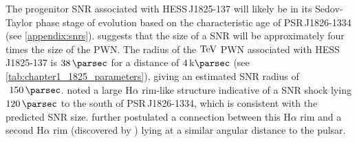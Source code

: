 The progenitor SNR associated with \mbox{HESS\,J1825-137} will likely be in its Sedov-Taylor phase stage of evolution based on the characteristic age of \mbox{PSR\,J1826-1334} (see \autoref{appendix:snrs}). \cite{2001A&A...380..309V} suggests that the size of a SNR will be approximately four times the size of the PWN. The radius of the $\TeV$ PWN associated with \mbox{HESS\,J1825-137} is $38\,\pc$ for a distance of $4\,\kpc$ (see \autoref{tab:chapter1_1825_parameters}), giving an estimated SNR radius of $~150\,\pc$. \cite{2016MNRAS.458.2813V} noted a large H$\alpha$ rim-like structure indicative of a SNR shock lying $120\,\pc$ to the south of \mbox{PSR\,J1826-1334}, which is consistent with the predicted SNR size. \cite{2016MNRAS.458.2813V} further postulated a connection between this H$\alpha$ rim and a second H$\alpha$ rim (discovered by \cite{2008MNRAS.390.1037S}) lying at a similar angular distance to the pulsar.

